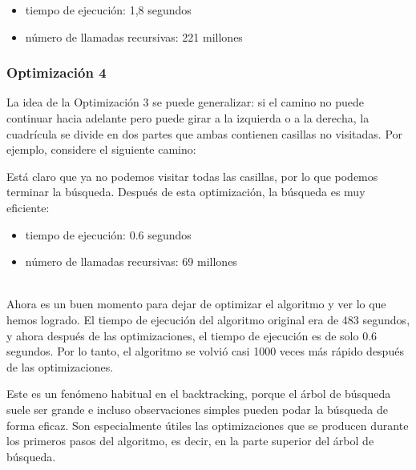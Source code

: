 \begin{itemize}
\item
tiempo de ejecución: 1,8 segundos
\item
número de llamadas recursivas: 221 millones
\end{itemize}

\subsubsection{Optimización 4}

La idea de la Optimización 3
se puede generalizar:
si el camino no puede continuar hacia adelante
pero puede girar a la izquierda o a la derecha,
la cuadrícula se divide en dos partes
que ambas contienen casillas no visitadas.
Por ejemplo, considere el siguiente camino:
\begin{center}
\end{center}
Está claro que ya no podemos visitar todas las casillas,
por lo que podemos terminar la búsqueda.
Después de esta optimización, la búsqueda es
muy eficiente:

\begin{itemize}
\item
tiempo de ejecución: 0.6 segundos
\item
número de llamadas recursivas: 69 millones
\end{itemize}

~\\
Ahora es un buen momento para dejar de optimizar
el algoritmo y ver lo que hemos logrado.
El tiempo de ejecución del algoritmo original
era de 483 segundos,
y ahora después de las optimizaciones,
el tiempo de ejecución es de solo 0.6 segundos.
Por lo tanto, el algoritmo se volvió casi 1000 veces
más rápido después de las optimizaciones.

Este es un fenómeno habitual en el backtracking,
porque el árbol de búsqueda suele ser grande
e incluso observaciones simples pueden
podar la búsqueda de forma eficaz.
Son especialmente útiles las optimizaciones que
se producen durante los primeros pasos del algoritmo,
es decir, en la parte superior del árbol de búsqueda.

